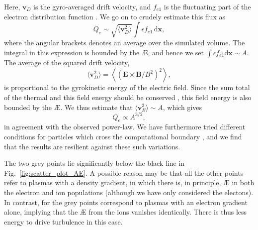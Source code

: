 Here, $\boldsymbol{v}_D$ is the gyro-averaged drift velocity, and $f_{e1}$ is the fluctuating part of the electron distribution function \citep{Gorler2010MultiscaleMicroturbulence}. We go on to crudely estimate this flux as
\begin{equation*}
    Q_e \sim \sqrt{\langle \mathbf{v}_D^2 \rangle} \int \epsilon f_{e1} \, \mathrm{d} \boldsymbol{x},
\end{equation*}
where the angular brackets denotes an average over the simulated volume.
The integral in this expression is bounded by the \AE{}, and hence we set $\int \epsilon f_{e1} \mathrm{d} \boldsymbol{x} \sim A$. The average of the squared drift velocity,
\begin{equation*}
    \langle \mathbf{v}_D^2 \rangle = \left\langle \left( \mathbf{E} \times \mathbf{B} / B^2 \right)^2 \right\rangle,
\end{equation*}
is proportional to the gyrokinetic energy of the electric field. Since the sum total of the thermal and this field energy should be conserved \cite{Helander2017AvailablePlasmas}, this field energy is also bounded by the \AE{}. We thus estimate that $\langle \mathbf{v}_E^2 \rangle \sim A$, which gives
\begin{equation}
    Q_e \propto A^{3/2},
\end{equation}
in agreement with the observed power-law. We have furthermore tried different conditions for particles which cross the computational boundary \citep{mackenbach2023bounceaveraged}, and we find that the results are resilient against these such variations. \par 
The two grey points lie significantly below the black line in Fig.~\ref{fig:scatter_plot_AE}. A possible reason may be that all the other points refer to plasmas with a density gradient, in which there is, in principle, \AE{} in both the electron and ion populations (although we have only considered the electons). In contrast, for the grey points correspond to plasmas with an electron gradient alone, implying that the \AE{} from the ions vanishes identically. There is thus less energy to drive turbulence in this case. 

